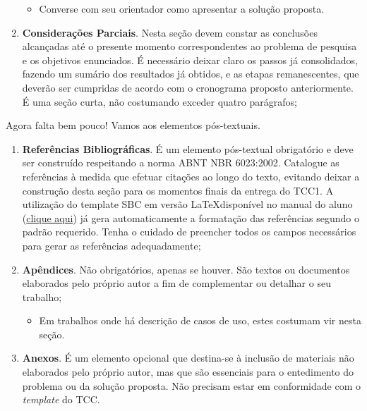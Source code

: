 \begin{enumerate}[resume]
\begin{itemize}
    \item Converse com seu orientador como apresentar a solução proposta.
  \end{itemize}
  \item \textbf{Considerações Parciais}. Nesta seção devem constar as conclusões alcançadas até o presente momento correspondentes ao problema de pesquisa e os objetivos enunciados. É necessário deixar claro os passos já consolidados, fazendo um sumário dos resultados já obtidos, e as etapas remanescentes, que deverão ser cumpridas de acordo com o cronograma proposto anteriormente. É uma seção curta, não costumando exceder quatro parágrafos;
\end{enumerate}

Agora falta bem pouco! Vamos aos elementos pós-textuais.

\begin{enumerate}[resume]
  \item \textbf{Referências Bibliográficas}. É um elemento pós-textual obrigatório e deve ser construído respeitando a norma ABNT NBR 6023:2002. Catalogue as referências à medida que efetuar citações ao longo do texto, evitando deixar a construção desta seção para os momentos finais da entrega do TCC1. A utilização do template SBC em versão \LaTeX disponível no manual do aluno (\href{https://github.com/elloa/manual-aluno/tree/master/templates/tcc1/latex}{clique aqui}) já gera automaticamente a formatação das referências segundo o padrão requerido. Tenha o cuidado de preencher todos os campos necessários para gerar as referências adequadamente;
  \item \textbf{Apêndices}. Não obrigatórios, apenas se houver. São textos ou documentos elaborados pelo próprio autor a fim de complementar ou detalhar o seu trabalho;
  \begin{itemize}
    \item Em trabalhos onde há descrição de casos de uso, estes costumam vir nesta seção.
  \end{itemize}
  \item \textbf{Anexos}. É um elemento opcional que destina-se à inclusão de materiais não elaborados pelo próprio autor, mas que são essenciais para o entedimento do problema ou da solução proposta. Não precisam estar em conformidade com o \emph{template} do TCC.
\end{enumerate}
